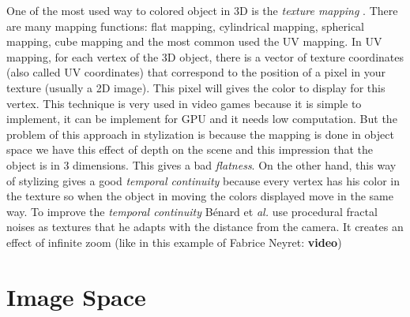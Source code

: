 One of the most used way to colored object in 3D is the \textit{texture mapping} \cite{texture_mapping}. There are many mapping functions: flat mapping, cylindrical mapping, spherical mapping, cube mapping and the most common used the UV mapping. In UV mapping, for each vertex of the 3D object, there is a vector of texture coordinates (also called UV coordinates) that correspond to the position of a pixel in your texture (usually a 2D image). This pixel will gives the color to display for this vertex. This technique is very used in video games because it is simple to implement, it can be implement for GPU and it needs low computation. But the problem of this approach in stylization is because the mapping is done in object space we have this effect of depth on the scene and this impression that the object is in 3 dimensions. This gives a bad \textit{flatness}. On the other hand, this way of stylizing gives a good \textit{temporal continuity} \cite{benard_dynamic_2009} because every vertex has his color in the texture so when the object in moving the colors displayed move in the same way. To improve the \textit{temporal continuity} Bénard et \textit{al.} \cite{benard_dynamic_2009} use procedural fractal noises as textures that he adapts with the distance from the camera. It creates an effect of infinite zoom (like in this example of Fabrice Neyret: \textbf{video})

\section{Image Space}
